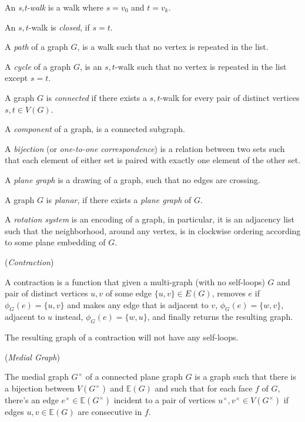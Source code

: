 \documentclass{article}
\begin{document}
	An \textit{s,t-walk} is a walk where $s = v_0$ and $t = v_k$.

	An $s,t$-walk is \textit{closed}, if $s = t$.

	A \textit{path} of a graph $G$, is a walk such that no vertex is repeated in the list.

	A \textit{cycle} of a graph $G$, is an $s,t$-walk such that no vertex is repeated in the list except $s=t$.

	A graph $G$ is \textit{connected} if there exists a $s,t$-walk for every pair of distinct vertices $s,t \in V(G)$.

	A \textit{component} of a graph, is a connected subgraph.

	A \textit{bijection} (or \textit{one-to-one correspondence}) is a relation between two sets such that each element of either set is paired with exactly one element of the other set.

	A \textit{plane graph} is a drawing of a graph, such that no edges are crossing.
	
	A graph $G$ is \textit{planar}, if there exists a \textit{plane graph} of $G$.

	A \textit{rotation system} is an encoding of a graph, in particular, it is an adjacency list such that the neighborhood, around any vertex, is in clockwise ordering according to some plane embedding of $G$.

	\begin{definition}\label{def:contraction}
		(\textit{Contraction})

		A contraction is a function that given a multi-graph (with no self-loops) $G$ and pair of distinct vertices $u,v$ of some edge $\{u,v\} \in E(G)$, removes $e$ if $\phi_G(e) = \{u,v\}$ and makes any edge that is adjacent to $v$, $\phi_G(e) = \{w,v\}$, adjacent to $u$ instead, $\phi_G(e) = \{w,u\}$, and finally returns the resulting graph.
	\end{definition}

	\begin{corollary}
		The resulting graph of a contraction will not have any self-loops.
	\end{corollary}

	\begin{center}
		
	\end{center}
	
	\begin{definition}\label{def:medial}
		(\textit{Medial Graph})
		
		The medial graph $G^\times$ of a connected plane graph $G$ is a graph such that there is a bijection between $V(G^\times)$ and $\mathbb{E}(G)$ and such that for each face $f$ of $G$, there's an edge $e^\times \in \mathbb{E}(G^\times)$ incident to a pair of vertices $u^\times,v^\times \in V(G^\times)$ if edges $u,v \in \mathbb{E}(G)$ are consecutive in $f$.
	\end{definition}
\end{document}
